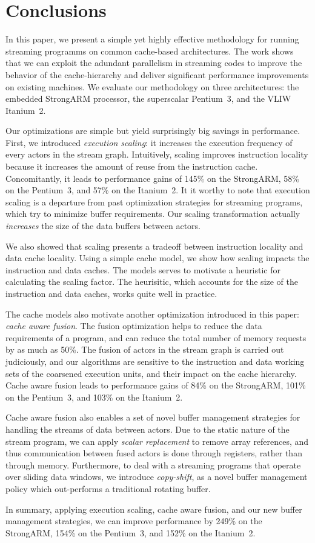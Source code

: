 \section{Conclusions}
\label{sec:conclusion}

In this paper, we present a simple yet highly effective methodology
for running streaming programms on common cache-based architectures.
The work shows that we can exploit the adundant parallelism in
streaming codes to improve the behavior of the cache-hierarchy and
deliver significant performance improvements on existing machines. We
evaluate our methodology on three architectures: the embedded
StrongARM processor, the superscalar Pentium~3, and the VLIW Itanium~2.

Our optimizations are simple but yield surprisingly big savings in
performance. First, we introduced {\it execution scaling}: it 
increases the execution frequency of every actors in the stream
graph. Intuitively, scaling improves instruction  locality because
it increases the amount of reuse from the instruction
cache. Concomitantly, it leads to performance gains of 145\% on the
StrongARM, 58\% on the Pentium~3, and 57\% on the Itanium~2.
It it worthy to note that execution scaling is a departure from
past optimization strategies for streaming programs, which try to
minimize buffer requirements. Our scaling transformation actually {\it
increases} the size of the data buffers between actors.

We also showed that scaling presents a tradeoff between 
instruction locality and  data cache locality. Using a simple cache
model, we show how scaling impacts the instruction and data
caches. The models serves to motivate a heuristic for calculating the
scaling factor. The heurisitic, which accounts for the size of the
instruction and data caches, works quite well in practice.

The cache models also motivate another optimization introduced in this
paper: {\it cache aware fusion}. The fusion optimization helps to
reduce the data requirements of a program, and can reduce the total
number of memory requests by as much as 50\%. The fusion of actors in
the stream graph is carried out judiciously, and our algorithms are
sensitive to the instruction and data working sets of the coarsened
execution units, and their impact on the cache hierarchy. Cache aware
fusion leads to performance gains of 84\% on the StrongARM, 101\% on the
Pentium~3, and 103\% on the Itanium~2.

Cache aware fusion also enables a set of novel buffer management
strategies for handling the streams of data between actors. Due to the
static nature of the stream program, we can apply {\it scalar
  replacement} to remove array references, and thus communication
between fused actors is done through registers, rather than through
memory. Furthermore, to deal with a streaming programs that operate
over sliding data windows, we introduce {\it copy-shift}, as a novel
buffer management policy which  out-performs a traditional rotating
buffer.

In summary, applying execution scaling, cache aware fusion, and our
new buffer management strategies, we can improve performance by 249\% on
the StrongARM, 154\% on the Pentium~3, and 152\% on the Itanium~2.




